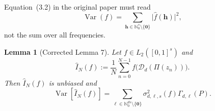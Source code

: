 \documentclass[11pt]{article}
\newtheorem{lemma}[theorem]{Lemma}
\newcommand{\Nzero}{\mathbb N_0}
\newcommand{\D}{\mathcal D}
\newcommand{\Var}{\operatorname{Var}}
\newcommand{\abs}[1]{\lvert #1\rvert}
\begin{document}
Equation~(3.2) in the original paper must read
\begin{equation}\label{eq:parseval-var}
 \Var(f)=\sum_{\boldsymbol h\in\Nzero^s\setminus\{\boldsymbol0\}}
          \abs{\widehat f(\boldsymbol h)}^2,
\end{equation}
not the sum over all frequencies.

\begin{lemma}[Corrected Lemma 7]\label{lem:variance-decomposition}
Let $f\in L_2([0,1]^s)$ and
\[
 \widehat I_N(f):=\frac1N\sum_{n=0}^{N-1}
 f\bigl(\D_d(\Pi(z_n))\bigr).
\]
Then $\widehat I_N(f)$ is unbiased and
\begin{equation}\label{eq:variance-decomposition}
 \Var[\widehat I_N(f)]
 =\sum_{\boldsymbol\ell\in\Nzero^{ds}\setminus\{\boldsymbol0\}}
    \sigma_{d,\boldsymbol\ell,s}^2(f)
    \Gamma_{d,\boldsymbol\ell}(P).
\end{equation}
\end{lemma}
\end{document}
